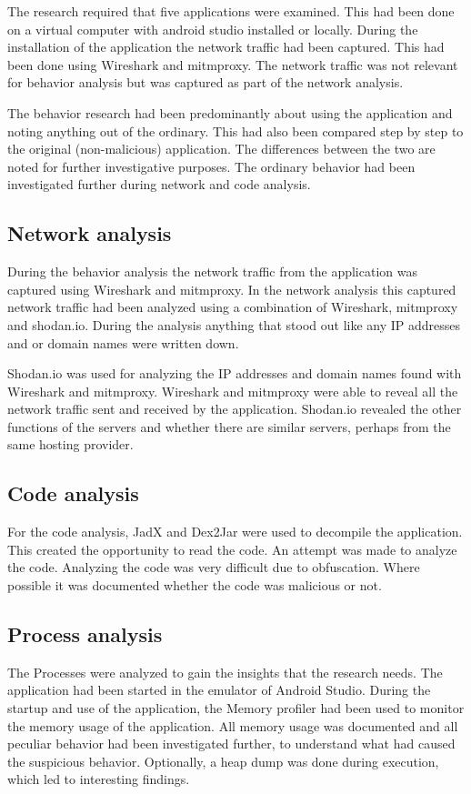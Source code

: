 The research required that five applications were examined. This had been done on a virtual computer with android studio installed or locally. During the installation of the application the network traffic had been captured. This had been done using Wireshark and mitmproxy. The network traffic was not relevant for behavior analysis but was captured as part of the network analysis.

The behavior research had been predominantly about using the application and noting anything out of the ordinary. This had also been compared step by step to the original (non-malicious) application. The differences between the two are noted for further investigative purposes. The ordinary behavior had been investigated further during network and code analysis.

\subsection{Network analysis}

During the behavior analysis the network traffic from the application was captured using Wireshark and mitmproxy. In the network analysis this captured network traffic had been analyzed using a combination of Wireshark, mitmproxy and shodan.io. During the analysis anything that stood out like any IP addresses and or domain names were written down.

Shodan.io was used for analyzing the IP addresses and domain names found with Wireshark and mitmproxy. Wireshark and mitmproxy were able to reveal all the network traffic sent and received by the application. Shodan.io revealed the other functions of the servers and whether there are similar servers, perhaps from the same hosting provider.

\subsection{Code analysis}

For the code analysis, JadX and Dex2Jar were used to decompile the application. This created the opportunity to read the code. An attempt was made to analyze the code. Analyzing the code was very difficult due to obfuscation. Where possible it was documented whether the code was malicious or not.

\subsection{Process analysis}
The Processes were analyzed to gain the insights that the research needs. The application had been started in the emulator of Android Studio. During the startup and use of the application, the Memory profiler had been used to monitor the memory usage of the application. All memory usage was documented and all peculiar behavior had been investigated further, to understand what had caused the suspicious behavior. Optionally, a heap dump was done during execution, which led to interesting findings.

